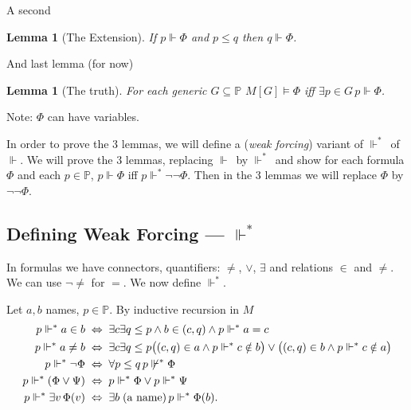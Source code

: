 \documentclass[11pt,pdftex,twoside,a4paper]{article}
\newcommand{\dsP}{\ensuremath{\mathds{P}}}
\newcommand{\forces}{\ensuremath{\Vdash}}
\newcommand{\forcesstar}{\ensuremath{\Vdash^*}}
\newtheorem{lemma}[thm]{Lemma}
\theoremstyle{definition}
\begin{document}
A second
\begin{lemma}[The Extension]
If \(p\Vdash \Phi\) and \(p\leq q\) then \(q\Vdash \Phi\).
\end{lemma}

And last lemma (for now)
\begin{lemma}[The truth]
For each generic \(G\subseteq \dsP\)
\(M[G] \models \Phi\)
iff \(\exists p\in G\, p\Vdash \Phi\).
\end{lemma}
Note: \(\Phi\) can have variables.

In order to prove the 3 lemmas, we will define
a (\emph{weak forcing}) variant of \forcesstar\ of
\forces.
We will prove the 3 lemmas, replacing \forces\ by \forcesstar\
and show for each formula \(\Phi\) and each \(p\in\dsP\),
\(p\forces \Phi\) iff \(p \forcesstar \neg\neg\Phi\).
Then in the 3 lemmas we will replace \(\Phi\) by \(\neg\neg\Phi\).

\subsection{Defining Weak Forcing --- \forcesstar}

In formulas we have connectors, quantifiers: \(\neq\), \(\lor\), \(\exists\)
and relations \(\in\) and \(\neq\). We can use \(\neg\neq\) for $=$.
We now define \forcesstar.

Let \(a,b\) names, \(p\in\dsP\). By inductive recursion in $M$
\begin{align}
p \forcesstar a\in b &\;\Leftrightarrow\; \exists c \exists q\leq p
 \land b\in(c,q) \land p \forcesstar a=c \label{eq:pforce:in} \\
p \forcesstar a \neq b &\;\Leftrightarrow\; \exists c \exists q\leq p
 \bigl( (c,q)\in a \land p\forcesstar c\notin b\bigr)
 \lor
 \bigl( (c,q)\in b \land p\forcesstar c\notin a\bigr) \label{eq:pforce:neq} \\
p \forcesstar \neg\Phi &\;\Leftrightarrow\;
 \forall p\leq q\, p\not\forcesstar\Phi \label{eq:pforce:neg} \\
p \forcesstar (\Phi \lor\Psi) &\;\Leftrightarrow\;
  p \forcesstar \Phi \lor p \forcesstar \Psi \label{eq:pforce:or} \\
p \forcesstar \exists v\,\Phi(v) &\;\Leftrightarrow\;
 \exists b \;\textnormal{(a name)} \, p \forcesstar \Phi(b).
   \label{eq:pforce:exists}
\end{align}

\end{document}

